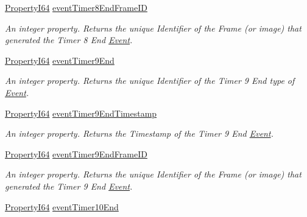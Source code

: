 \begin{DoxyCompactItemize}
\hyperlink{group___common_interface_ga81749b2696755513663492664a18a893}{Property\+I64} \hyperlink{classmv_i_m_p_a_c_t_1_1acquire_1_1_gen_i_cam_1_1_event_control_a77db5dd659be0dc0913a052b0c15dcdd}{event\+Timer8\+End\+Frame\+I\+D}
\begin{DoxyCompactList}\small\item\em An integer property. Returns the unique Identifier of the Frame (or image) that generated the Timer 8 End \hyperlink{classmv_i_m_p_a_c_t_1_1acquire_1_1_event}{Event}. \end{DoxyCompactList}\item 
\hyperlink{group___common_interface_ga81749b2696755513663492664a18a893}{Property\+I64} \hyperlink{classmv_i_m_p_a_c_t_1_1acquire_1_1_gen_i_cam_1_1_event_control_a1af5ba37c4b4b3eb094b2048e2399eb5}{event\+Timer9\+End}
\begin{DoxyCompactList}\small\item\em An integer property. Returns the unique Identifier of the Timer 9 End type of \hyperlink{classmv_i_m_p_a_c_t_1_1acquire_1_1_event}{Event}. \end{DoxyCompactList}\item 
\hyperlink{group___common_interface_ga81749b2696755513663492664a18a893}{Property\+I64} \hyperlink{classmv_i_m_p_a_c_t_1_1acquire_1_1_gen_i_cam_1_1_event_control_a60385b4f85d500c5b228f25f7288a183}{event\+Timer9\+End\+Timestamp}
\begin{DoxyCompactList}\small\item\em An integer property. Returns the Timestamp of the Timer 9 End \hyperlink{classmv_i_m_p_a_c_t_1_1acquire_1_1_event}{Event}. \end{DoxyCompactList}\item 
\hyperlink{group___common_interface_ga81749b2696755513663492664a18a893}{Property\+I64} \hyperlink{classmv_i_m_p_a_c_t_1_1acquire_1_1_gen_i_cam_1_1_event_control_ae7670b9a9130d19f149c757600ce0a93}{event\+Timer9\+End\+Frame\+I\+D}
\begin{DoxyCompactList}\small\item\em An integer property. Returns the unique Identifier of the Frame (or image) that generated the Timer 9 End \hyperlink{classmv_i_m_p_a_c_t_1_1acquire_1_1_event}{Event}. \end{DoxyCompactList}\item 
\hyperlink{group___common_interface_ga81749b2696755513663492664a18a893}{Property\+I64} \hyperlink{classmv_i_m_p_a_c_t_1_1acquire_1_1_gen_i_cam_1_1_event_control_a9748c5e2c5139c4387000397a7bb7619}{event\+Timer10\+End}

\end{DoxyCompactItemize}
